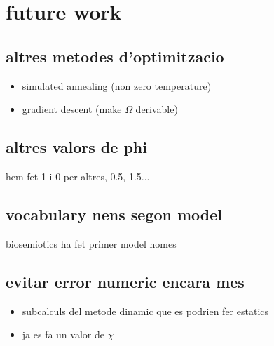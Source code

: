 \section{future work}
\subsection{altres metodes d'optimitzacio}
\begin{itemize}
\item simulated annealing (non zero temperature)
\item gradient descent (make $\Omega$ derivable)
\end{itemize}
\subsection{altres valors de phi}
hem fet 1 i 0 per altres, 0.5, 1.5...
\subsection{vocabulary nens segon model}
biosemiotics ha fet primer model nomes
\subsection{evitar error numeric encara mes}
\begin{itemize}
\item subcalculs del metode dinamic que es podrien fer estatics
\item ja es fa un valor de $\chi$
\end{itemize}

